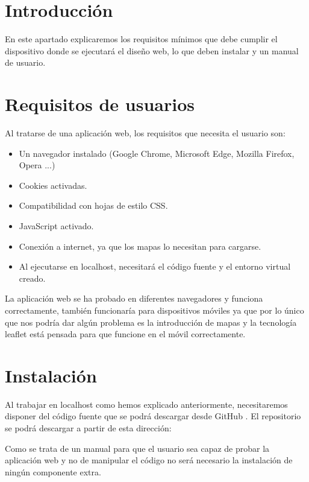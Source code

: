 
\section{Introducción}

En este apartado explicaremos los requisitos mínimos que debe cumplir el dispositivo donde se ejecutará el diseño web, lo que deben instalar y un manual de usuario.

\section{Requisitos de usuarios}

Al tratarse de una aplicación web, los requisitos que necesita el usuario son:

\begin{itemize}
	\item Un navegador instalado (Google Chrome, Microsoft Edge, Mozilla Firefox, Opera ...)
	\item Cookies activadas.
	\item Compatibilidad con hojas de estilo CSS.
	\item JavaScript activado.
	\item Conexión a internet, ya que los mapas lo necesitan para cargarse.
	\item Al ejecutarse en localhost, necesitará el código fuente y el entorno virtual creado.
\end{itemize}
 
 La aplicación web se ha probado en diferentes navegadores y funciona correctamente, también funcionaría para dispositivos móviles ya que por lo único que nos podría dar algún problema es la introducción de mapas y la tecnología leaflet está pensada para que funcione en el móvil correctamente.

\section{Instalación}

Al trabajar en localhost como hemos explicado anteriormente, necesitaremos disponer del código fuente que se podrá descargar desde GitHub \cite{GitHub}. El repositorio se podrá descargar a partir de esta dirección: \cite{Repositorio}

Como se trata de un manual para que el usuario sea capaz de probar la aplicación web y no de manipular el código no será necesario la instalación de ningún componente extra.

